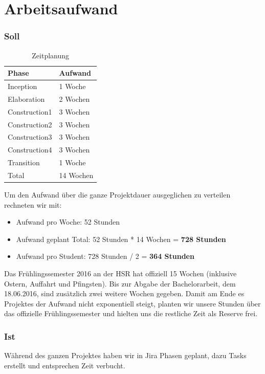 \section{Arbeitsaufwand}
\subsubsection{Soll}

\begin{table}[H]
	\centering
    \begin{tabular}{|p{6cm}|p{6cm}|}
    \hline    
    \rowcolor{lightblue}
	Phase & Aufwand \\ \hline   
	Inception & 1 Woche \\ \hline
	Elaboration & 2 Wochen \\ \hline
	Construction1 & 3 Wochen \\ \hline
	Construction2 & 3 Wochen \\ \hline
	Construction3 & 3 Wochen \\ \hline
	Construction4 & 3 Wochen \\ \hline
	Transition & 1 Woche \\ \hline
	\rowcolor{lightblue}
	Total & 14 Wochen \\ \hline
    \end{tabular}
    \caption[Zeitplanung]{Zeitplanung}
\end{table}
\medskip
Um den Aufwand über die ganze Projektdauer ausgeglichen zu verteilen rechneten wir mit:
\begin{itemize}
    \item Aufwand pro Woche: 52 Stunden
    \item Aufwand geplant Total: 52 Stunden * 14 Wochen = \textbf{728 Stunden}
    \item Aufwand pro Student: 728 Stunden / 2 = \textbf{364 Stunden}
\end{itemize}

Das Frühlingssemester 2016 an der HSR hat offiziell 15 Wochen  (inklusive Ostern, Auffahrt und Pfingsten). Bis zur Abgabe der Bachelorarbeit, dem 18.06.2016, sind zusätzlich zwei weitere Wochen gegeben. Damit am Ende es Projektes der Aufwand nicht exponentiell steigt, planten wir unsere Stunden über das offizielle Frühlingssemester und hielten uns die restliche Zeit als Reserve frei.
\newpage
\subsubsection{Ist}
Während des ganzen Projektes haben wir in Jira Phasen geplant, dazu Tasks erstellt und entsprechen Zeit verbucht.


